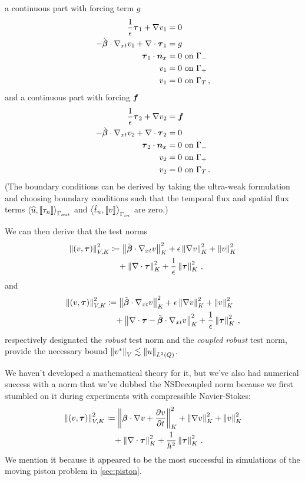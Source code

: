 \documentclass[Dissertation.tex]{subfiles}
\begin{document}
a continuous part with forcing term $g$
\begin{align*}
\frac{1}{\epsilon}\boldsymbol\tau_1+\nabla v_1 &=0\\
-\tilde{\boldsymbol\beta}\cdot\nabla_{xt} v_1 + \nabla\cdot\boldsymbol\tau_1 &= g\\
\boldsymbol\tau_1\cdot\boldsymbol n_x &= 0 \text{ on } \Gamma_-\\
v_1 &= 0 \text{ on } \Gamma_+\\
v_1 &= 0 \text{ on } \Gamma_T\,,
\end{align*}
and a continuous part with forcing $\boldsymbol f$
\begin{align*}
\frac{1}{\epsilon}\boldsymbol\tau_2+\nabla v_2 &=\boldsymbol f\\
-\tilde{\boldsymbol\beta}\cdot\nabla_{xt} v_2 + \nabla\cdot\boldsymbol\tau_2 &= 0\\
\boldsymbol\tau_2\cdot\boldsymbol n_x &= 0 \text{ on } \Gamma_-\\
v_2 &= 0 \text{ on } \Gamma_+\\
v_2 &= 0 \text{ on } \Gamma_T\,.
\end{align*}
(The boundary conditions can be derived by taking the ultra-weak formulation and choosing boundary conditions such that the temporal flux and spatial flux terms $\left\langle \widehat{u}, \left[ \![\tau_n]\! \right] \right\rangle_{\Gamma_{out}}$ and $\left\langle \hat t_n,\left[ \![v]\! \right] \right\rangle_{\Gamma_{in}}$ are zero.)

We can then derive that the test norms
\begin{align}
\label{eq:robustnorm}
\left\| \left( v,\boldsymbol\tau \right) \right\|_{V,K}^2 &\coloneqq
\left\| \tilde{\boldsymbol\beta}\cdot\nabla_{xt} v \right\|_K^2
+ \epsilon\left\| \nabla v \right\|_K^2
+ \left\| v \right\|^2_K\\\nonumber&\quad
+ \left\| \nabla\cdot \boldsymbol\tau \right\|_K^2
+ \frac{1}{\epsilon}\left\| \boldsymbol\tau \right\|_K^2\,,
\end{align}
and
\begin{align}
\label{eq:coupledrobustnorm}
\left\| \left( v,\boldsymbol\tau \right) \right\|_{V,K}^2 &\coloneqq
\left\| \tilde{\boldsymbol\beta}\cdot\nabla_{xt} v \right\|_K^2
+ \epsilon\left\| \nabla v \right\|_K^2
+ \left\| v \right\|^2_K\\\nonumber&\quad
+ \left\| \nabla\cdot \boldsymbol\tau - \tilde{\boldsymbol\beta}\cdot\nabla_{xt} v \right\|_K^2
+ \frac{1}{\epsilon}\left\| \boldsymbol\tau \right\|_K^2\,,
\end{align}
respectively designated the \emph{robust} test norm and the \emph{coupled robust} test norm,
provide the necessary bound $\left\| v^* \right\|_V \lesssim \left\| u \right\|_{L^2\left( Q \right)}$.
\begin{remark}
We haven't developed a mathematical theory for it, but we've also had numerical success with a norm that 
we've dubbed the NSDecoupled norm because we first stumbled on it during experiments with compressible
Navier-Stokes:
\begin{align*}
\left\| \left( v,\boldsymbol\tau \right) \right\|_{V,K}^2 &\coloneqq
\left\| \boldsymbol\beta\cdot\nabla v+\frac{\partial v}{\partial t} \right\|_K^2
+ \left\| \nabla v \right\|_K^2
+ \left\| v \right\|^2_K
\\\nonumber&\quad
+ \left\| \nabla\cdot \boldsymbol\tau \right\|_K^2
+ \frac{1}{h^2}\left\| \boldsymbol\tau \right\|_K^2\,.
\end{align*}
We mention it because it appeared to be the most successful in simulations
of the moving piston problem in \ref{sec:piston}.
\end{remark}
\end{document}
